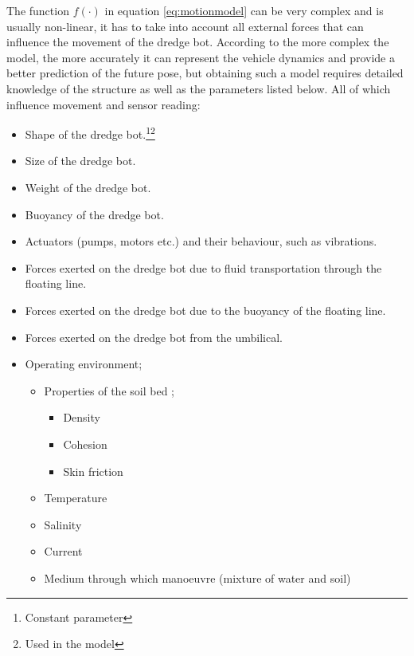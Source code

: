 The function $ f(\cdot) $ in equation \ref{eq:motionmodel} can be very complex and is usually non-linear, it has to take into account all external forces that can influence the movement of the dredge bot. According to \citet{bahr_cooperative_2009} the more complex the model, the more accurately it can represent the vehicle dynamics and provide a better prediction of the future pose, but obtaining such a model requires detailed knowledge of the structure as well as the parameters listed below. All of which influence movement and sensor reading:
\begin{itemize}
	\setlength\itemsep{0mm}
	\item Shape of the dredge bot.\footnote{\label{c} Constant parameter}\footnote{\label{used} Used in the model}
	\item Size of the dredge bot.\footnotemark[\getrefnumber{c}]
	\item Weight of the dredge bot.\footnotemark[\getrefnumber{c}]
	\item Buoyancy of the dredge bot.\footnotemark[\getrefnumber{c}]
	\item Actuators (pumps, motors etc.) and their behaviour, such as vibrations.
	\item Forces exerted on the dredge bot due to fluid transportation through the floating line.
	\item Forces exerted on the dredge bot due to the buoyancy of the floating line.
	\item Forces exerted on the dredge bot from the umbilical.
	\item Operating environment;
	\begin{itemize}
		\setlength\itemsep{0mm}
		\item Properties of the soil bed \cite{lotman_applicable_2009};
		\begin{itemize}
			\setlength\itemsep{0mm}
			\item Density
			\item Cohesion
			\item Skin friction
		\end{itemize}
		\item Temperature
		\item Salinity
		\item Current
		\item Medium through which manoeuvre (mixture of water and soil)

\end{itemize}
\end{itemize}
